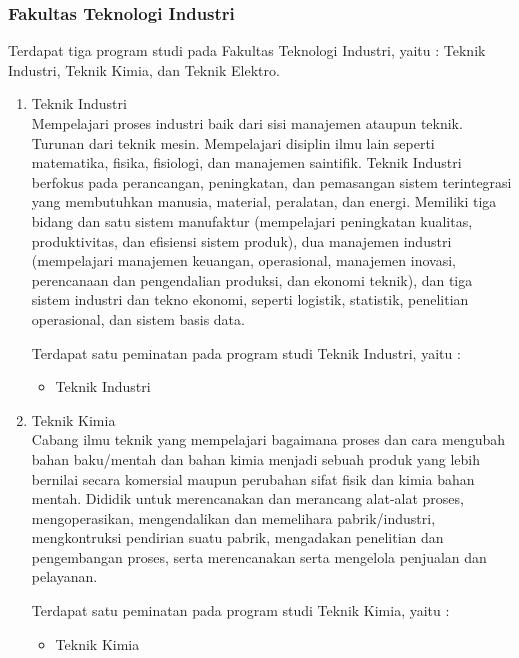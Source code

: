 \subsubsection{Fakultas Teknologi Industri}
Terdapat tiga program studi pada Fakultas Teknologi Industri, yaitu : Teknik Industri, Teknik Kimia, dan Teknik Elektro.
	\begin{enumerate}
		\item Teknik Industri\\
			Mempelajari proses industri baik dari sisi manajemen ataupun teknik. Turunan dari teknik mesin. Mempelajari disiplin ilmu lain seperti matematika, fisika, fisiologi, dan manajemen saintifik. Teknik Industri berfokus pada perancangan, peningkatan, dan pemasangan sistem terintegrasi yang membutuhkan manusia, material, peralatan, dan energi. Memiliki tiga bidang dan satu sistem manufaktur (mempelajari peningkatan kualitas, produktivitas, dan efisiensi sistem produk), dua manajemen industri (mempelajari manajemen keuangan, operasional, manajemen inovasi, perencanaan dan pengendalian produksi, dan ekonomi teknik), dan tiga sistem industri dan tekno ekonomi, seperti logistik, statistik, penelitian operasional, dan sistem basis data.
			
			Terdapat satu peminatan pada program studi Teknik Industri, yaitu :
			
			\begin{itemize}
				\item Teknik Industri
			\end{itemize}\leavevmode
			
		\item Teknik Kimia\\
			Cabang ilmu teknik yang mempelajari bagaimana proses dan cara mengubah bahan baku/mentah dan bahan kimia menjadi sebuah produk yang lebih bernilai secara komersial maupun perubahan sifat fisik dan kimia bahan mentah. Dididik untuk merencanakan dan merancang alat-alat proses, mengoperasikan, mengendalikan dan memelihara pabrik/industri, mengkontruksi pendirian suatu pabrik, mengadakan penelitian dan pengembangan proses, serta merencanakan serta mengelola penjualan dan pelayanan.
			
			Terdapat satu peminatan pada program studi Teknik Kimia, yaitu :
			
			\begin{itemize}
				\item Teknik Kimia
			\end{itemize}\leavevmode


\end{enumerate}
